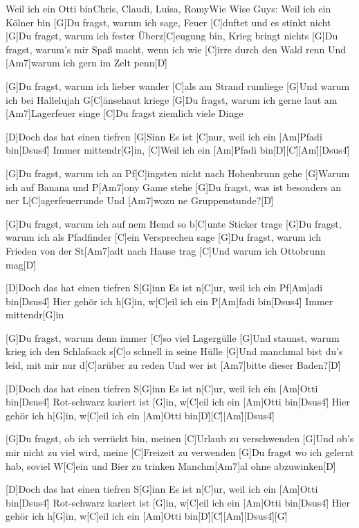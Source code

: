 \documentclass[../main.tex]{subfiles}
\begin{document}
\begin{song}{Weil ich ein Otti bin}{Chris, Claudi, Luisa, Romy}{Wie Wise Guys: Weil ich ein Kölner bin}
[G]Du fragst, warum ich sage, Feuer [C]duftet und es stinkt nicht
[G]Du fragst, warum ich fester Überz[C]eugung bin, Krieg bringt nichts
[G]Du fragst, warum's mir Spaß macht, wenn ich wie [C]irre durch den Wald renn
Und [Am7]warum ich gern im Zelt penn[D]{\h}

[G]Du fragst, warum ich lieber wander [C]als am Strand rumliege
[G]Und warum ich bei Hallelujah G[C]{ä}nsehaut kriege
[G]Du fragst, warum ich gerne laut am [Am7]Lagerfeuer singe
[C]Du fragst ziemlich viele Dinge

[D]Doch das hat einen tiefren [G]Sinn
Es ist [C]nur, weil ich ein [Am]Pfadi bin[Dsus4]{\h}
Immer mittendr[G]in, 
[C]Weil ich ein [Am]Pfadi bin[D]{\h}[C]{\h}[Am]{\h}[Dsus4]{\h}

[G]Du fragst, warum ich an Pf[C]ingsten nicht nach Hohenbrunn gehe
[G]Warum ich auf Banana und P[Am7]ony Game stehe
[G]Du fragst, was ist besonders an ner L[C]agerfeuerrunde
Und [Am7]wozu ne Gruppenstunde?[D]{\h}

[G]Du fragst, warum ich auf nem Hemd so b[C]unte Sticker trage
[G]Du fragst, warum ich als Pfadfinder [C]ein Versprechen sage
[G]Du fragst, warum ich Frieden von der St[Am7]adt nach Hause trag
[C]Und warum ich Ottobrunn mag[D]{\h}

[D]Doch das hat einen tiefren S[G]inn
Es ist n[C]ur, weil ich ein Pf[Am]adi bin[Dsus4]{\h}
Hier gehör ich h[G]in, w[C]eil ich ein P[Am]fadi bin[Dsus4]{\h}
Immer mittendr[G]in

[G]Du fragst, warum denn immer [C]so viel Lagergülle
[G]Und staunst, warum krieg ich den Schlafsack s[C]o schnell in seine Hülle
[G]Und manchmal bist du's leid, mit mir nur d[C]arüber zu reden
Und wer ist [Am7]bitte dieser Baden?[D]{\h}

[D]Doch das hat einen tiefren S[G]inn
Es ist n[C]ur, weil ich ein [Am]Otti bin[Dsus4]{\h}
Rot-schwarz kariert ist [G]in, w[C]eil ich ein [Am]Otti bin[Dsus4]{\h}
Hier gehör ich h[G]in, w[C]eil ich ein [Am]Otti bin[D]{\h}[C]{\h}[Am]{\h}[Dsus4]{\h}\pagebreak

[G]Du fragst, ob ich verrückt bin, meinen [C]Urlaub zu verschwenden
[G]Und ob's mir nicht zu viel wird, meine [C]Freizeit zu verwenden
[G]Du fragst wo ich gelernt hab, soviel W[C]ein und Bier zu trinken
Manchm[Am7]al ohne abzuwinken[D]{\h}

[D]Doch das hat einen tiefren S[G]inn
Es ist n[C]ur, weil ich ein [Am]Otti bin[Dsus4]{\h}
Rot-schwarz kariert ist [G]in, w[C]eil ich ein [Am]Otti bin[Dsus4]{\h}
Hier gehör ich h[G]in, w[C]eil ich ein [Am]Otti bin[D]{\h}[C]{\h}[Am]{\h}[Dsus4]{\h}[G]{\h}
\end{song}
\end{document}
